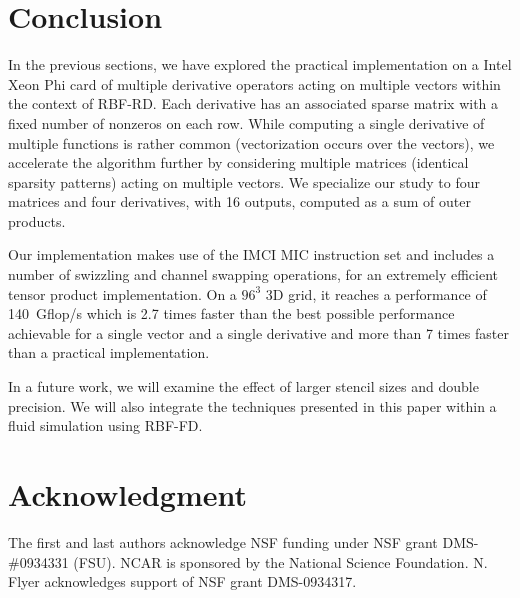 \documentclass[10pt,conference,compsocconf]{IEEEtran}
\begin{document}
\section{Conclusion}
\label{sec:ccl}

In the previous sections, we have explored the practical
implementation on a Intel Xeon Phi card of multiple derivative
operators acting on multiple vectors within the context of
RBF-RD. Each derivative has an associated sparse matrix with a fixed
number of nonzeros on each row. While computing a single derivative of
multiple functions is rather common (vectorization occurs over the
vectors), we accelerate the algorithm further by considering multiple
matrices (identical sparsity patterns) acting on multiple vectors. 
We specialize our study to four matrices and four derivatives,
with 16 outputs, computed as a sum of outer products.

Our implementation makes use of the IMCI MIC instruction set and
includes a number of swizzling and channel swapping operations, for an
extremely efficient tensor product implementation. On a $96^3$ 3D
grid, it reaches a performance of 140~Gflop/s which is 2.7 times
faster than the best possible performance achievable for a single
vector and a single derivative and more than 7 times faster than a
practical implementation.

In a future work, we will examine the effect of larger stencil sizes
and double precision. We will also integrate the techniques
presented in this paper within a fluid simulation using RBF-FD.

\section*{Acknowledgment}
The first and last authors acknowledge NSF funding under NSF grant
DMS-\#0934331 (FSU). NCAR is sponsored by the National Science
Foundation. N. Flyer acknowledges support of NSF grant DMS-0934317.



\end{document}
